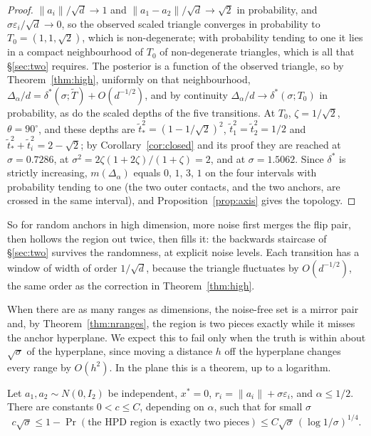 \begin{proof}
$\|a_i\|/\sqrt d \to 1$ and $\|a_1 - a_2\|/\sqrt d \to \sqrt2$ in probability, and $\sigma\varepsilon_i/\sqrt d \to 0$, so the
observed scaled triangle converges in probability to $T_0 = (1, 1, \sqrt2)$, which is non-degenerate; with probability
tending to one it lies in a compact neighbourhood of $T_0$ of non-degenerate triangles, which is all that
\S\ref{sec:two} requires. The posterior is a function of the observed triangle, so by
Theorem~\ref{thm:high}, uniformly on that neighbourhood, $\Delta_\alpha/d = \delta^*(\sigma; \tilde T) + O(d^{-1/2})$, and by
continuity $\Delta_\alpha/d \to \delta^*(\sigma; T_0)$ in probability, as do the scaled depths of the five transitions. At
$T_0$, $\zeta = 1/\sqrt2$, $\theta = 90^\circ$, and these depths are $\tilde t_*^2 = (1 - 1/\sqrt2)^2$, $\tilde t_1^2 = \tilde t_2^2 = 1/2$
and $\tilde t_*^2 + \tilde t_i^2 = 2 - \sqrt2$; by Corollary~\ref{cor:closed} and its proof they are reached at
$\sigma = 0.7286$, at $\sigma^2 = 2\zeta(1 + 2\zeta)/(1 + \zeta) = 2$, and at $\sigma = 1.5062$. Since $\delta^*$ is strictly increasing,
$m(\Delta_\alpha)$ equals $0$, $1$, $3$, $1$ on the four intervals with probability tending to one (the two outer contacts,
and the two anchors, are crossed in the same interval), and Proposition~\ref{prop:axis} gives the topology.
\end{proof}

So for random anchors in high dimension, more noise first merges the flip pair, then hollows the region out twice,
then fills it: the backwards staircase of \S\ref{sec:two} survives the randomness, at explicit noise levels. Each
transition has a window of width of order $1/\sqrt d$, because the triangle fluctuates by $O(d^{-1/2})$, the same order
as the correction in Theorem~\ref{thm:high}.

When there are as many ranges as dimensions, the noise-free set is a mirror pair and, by Theorem~\ref{thm:nranges},
the region is two pieces exactly while it misses the anchor hyperplane. We expect this to fail only when the truth is
within about $\sqrt\sigma$ of the hyperplane, since moving a distance $h$ off the hyperplane changes every range by
$O(h^2)$. In the plane this is a theorem, up to a logarithm.

\begin{theorem}\label{thm:sqrtlaw}
Let $a_1, a_2 \sim N(0, I_2)$ be independent, $x^* = 0$, $r_i = \|a_i\| + \sigma\varepsilon_i$, and $\alpha \le 1/2$. There are
constants $0 < c \le C$, depending on $\alpha$, such that for small $\sigma$
\[ c\sqrt\sigma \le 1 - \Pr(\text{the HPD region is exactly two pieces}) \le C\sqrt\sigma\,(\log 1/\sigma)^{1/4} . \]
\end{theorem}

